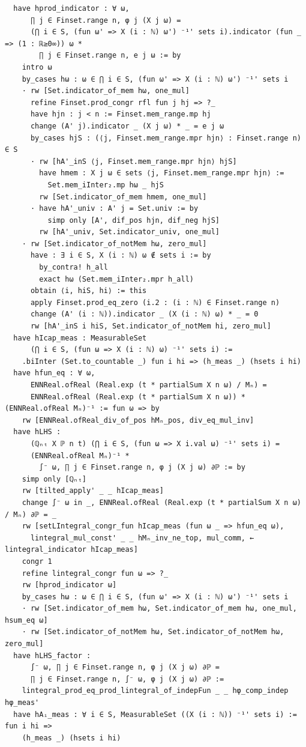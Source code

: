 \newpage
\begin{lstlisting}
  have hprod_indicator : ∀ ω,
      ∏ j ∈ Finset.range n, φ j (X j ω) =
      (⋂ i ∈ S, (fun ω' => X (i : ℕ) ω') ⁻¹' sets i).indicator (fun _ => (1 : ℝ≥0∞)) ω *
        ∏ j ∈ Finset.range n, e j ω := by
    intro ω
    by_cases hω : ω ∈ ⋂ i ∈ S, (fun ω' => X (i : ℕ) ω') ⁻¹' sets i
    · rw [Set.indicator_of_mem hω, one_mul]
      refine Finset.prod_congr rfl fun j hj => ?_
      have hjn : j < n := Finset.mem_range.mp hj
      change (A' j).indicator _ (X j ω) * _ = e j ω
      by_cases hjS : (⟨j, Finset.mem_range.mpr hjn⟩ : Finset.range n) ∈ S
      · rw [hA'_inS ⟨j, Finset.mem_range.mpr hjn⟩ hjS]
        have hmem : X j ω ∈ sets ⟨j, Finset.mem_range.mpr hjn⟩ :=
          Set.mem_iInter₂.mp hω _ hjS
        rw [Set.indicator_of_mem hmem, one_mul]
      · have hA'_univ : A' j = Set.univ := by
          simp only [A', dif_pos hjn, dif_neg hjS]
        rw [hA'_univ, Set.indicator_univ, one_mul]
    · rw [Set.indicator_of_notMem hω, zero_mul]
      have : ∃ i ∈ S, X (i : ℕ) ω ∉ sets i := by
        by_contra! h_all
        exact hω (Set.mem_iInter₂.mpr h_all)
      obtain ⟨i, hiS, hi⟩ := this
      apply Finset.prod_eq_zero (i.2 : (i : ℕ) ∈ Finset.range n)
      change (A' (i : ℕ)).indicator _ (X (i : ℕ) ω) * _ = 0
      rw [hA'_inS i hiS, Set.indicator_of_notMem hi, zero_mul]
  have hIcap_meas : MeasurableSet
      (⋂ i ∈ S, (fun ω => X (i : ℕ) ω) ⁻¹' sets i) :=
    .biInter (Set.to_countable _) fun i hi => (h_meas _) (hsets i hi)
  have hfun_eq : ∀ ω,
      ENNReal.ofReal (Real.exp (t * partialSum X n ω) / Mₙ) =
      ENNReal.ofReal (Real.exp (t * partialSum X n ω)) * (ENNReal.ofReal Mₙ)⁻¹ := fun ω => by
    rw [ENNReal.ofReal_div_of_pos hMₙ_pos, div_eq_mul_inv]
  have hLHS :
      (ℚₙₜ X ℙ n t) (⋂ i ∈ S, (fun ω => X i.val ω) ⁻¹' sets i) =
      (ENNReal.ofReal Mₙ)⁻¹ *
        ∫⁻ ω, ∏ j ∈ Finset.range n, φ j (X j ω) ∂ℙ := by
    simp only [ℚₙₜ]
    rw [tilted_apply' _ _ hIcap_meas]
    change ∫⁻ ω in _, ENNReal.ofReal (Real.exp (t * partialSum X n ω) / Mₙ) ∂ℙ = _
    rw [setLIntegral_congr_fun hIcap_meas (fun ω _ => hfun_eq ω),
      lintegral_mul_const' _ _ hMₙ_inv_ne_top, mul_comm, ← lintegral_indicator hIcap_meas]
    congr 1
    refine lintegral_congr fun ω => ?_
    rw [hprod_indicator ω]
    by_cases hω : ω ∈ ⋂ i ∈ S, (fun ω' => X (i : ℕ) ω') ⁻¹' sets i
    · rw [Set.indicator_of_mem hω, Set.indicator_of_mem hω, one_mul, hsum_eq ω]
    · rw [Set.indicator_of_notMem hω, Set.indicator_of_notMem hω, zero_mul]
  have hLHS_factor :
      ∫⁻ ω, ∏ j ∈ Finset.range n, φ j (X j ω) ∂ℙ =
      ∏ j ∈ Finset.range n, ∫⁻ ω, φ j (X j ω) ∂ℙ :=
    lintegral_prod_eq_prod_lintegral_of_indepFun _ _ hφ_comp_indep hφ_meas'
  have hAᵢ_meas : ∀ i ∈ S, MeasurableSet ((X (i : ℕ)) ⁻¹' sets i) := fun i hi =>
    (h_meas _) (hsets i hi)
\end{lstlisting}

